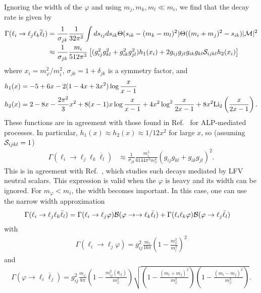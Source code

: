 {Ignoring the width of the $\varphi$ and using $m_j, m_k, m_l \ll m_i$, we find that the decay rate is given by
\begin{align}
    \Gamma(\ell_i \rightarrow \ell_j \ell_k \overline{\ell}_l) &= \frac{1}{\sigma_{jk}}\frac{1}{32\pi^2}\int{ds_{ij}ds_{ik}\Theta(s_{ik}-(m_k - m_l)^2)\Theta((m_i+m_j)^2-s_{ik})|{\cal M}|^2}\nonumber\\
    &\approx \frac{1}{\sigma_{jk}}\frac{m_i}{512\pi^3}\left[(g_{ij}^2g_{kl}^2+g_{ik}^2g_{jl}^2)h_1(x_i) + 2g_{ij}g_{jl}g_{ik}g_{kl}{\cal S}_{ijkl}h_2(x_i)\right]
\end{align}
where $x_i = m_\varphi^2/m_i^2$, $\sigma_{jk} = 1 + \delta_{jk}$ is a symmetry factor, and
\begin{align}
    h_1(x) &= -5 + 6x-2(1-4x+3x^2)\log\frac{x}{x-1}\\
    h_2(x) &= 2-8x-\frac{2\pi^2}{3}x^2+8(x-1)x\log\frac{x}{x-1}+4x^2\log^2\frac{x}{2x-1}+8x^2{\rm Li}_2\left(\frac{x}{2x-1}\right).
\end{align}
These functions are in agreement with those found in Ref.~\cite{Cornella:2019uxs} for ALP-mediated processes. In particular, $h_1(x) \approx h_2(x) \approx 1/12x^2$ for large $x$, so (assuming ${\cal S}_{ijkl} = 1$)
\begin{align}
\Gamma(\ell_i \rightarrow \ell_j \ell_k \overline{\ell}_l) &\approx \frac{1}{\sigma_{jk}}\frac{m_i^5}{6144\pi^3m_\varphi^4}(g_{ij}g_{kl} + g_{ik}g_{jl})^2.
\end{align}
This is in agreement with  Ref.~\cite{Dev:2017ftk}, which studies such decays mediated by LFV neutral scalars. This expression is valid when the $\varphi$ is heavy and its width can be ignored. For $m_\varphi < m_i$, the width becomes important. In this case, one can use the narrow width approximation
\begin{align}
    \Gamma(\ell_i \rightarrow \ell_j\ell_k\bar{\ell}_l) &= \Gamma(\ell_i\rightarrow \ell_j\varphi){\cal B}(\varphi\rightarrow \rightarrow \ell_k\bar{\ell}_l)+\Gamma(\ell_i\ell_k\varphi){\cal B}(\varphi \rightarrow \ell_j\bar{\ell}_l)
\end{align}
with 
\begin{align}
    \Gamma(\ell_i\rightarrow \ell_j\varphi) = g_{ij}^2\frac{m_i}{16\pi}\left(1-\frac{m_\varphi^2}{m_i^2}\right)^2
\end{align}
and
\begin{align}
\Gamma(\varphi\rightarrow \ell_i\bar{\ell}_j) = g_{ij}^2\frac{m_\varphi}{8\pi}\left(1 - \frac{m_{ij}^2(\theta_{ij})}{m_\varphi^2}\right)\sqrt{\left(1- \frac{(m_i + m_j)^2}{m_\varphi^2}\right)\left(1- \frac{(m_i - m_j)^2}{m_\varphi^2}\right)}.

\end{align}}
